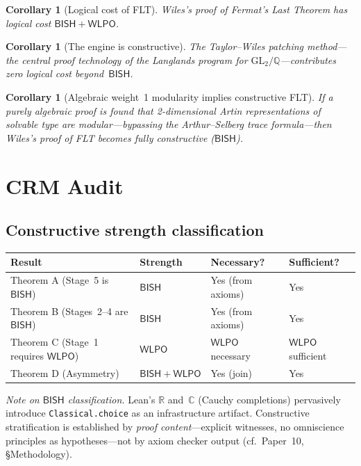 \documentclass[11pt]{article}
\theoremstyle{plain}
\newtheorem{corollary}[theorem]{Corollary}
\theoremstyle{definition}
\theoremstyle{remark}
\newcommand{\Q}{\mathbb{Q}}
\newcommand{\R}{\mathbb{R}}
\newcommand{\C}{\mathbb{C}}
\newcommand{\GL}{\mathrm{GL}}
\newcommand{\BISH}{\mathsf{BISH}}
\newcommand{\WLPO}{\mathsf{WLPO}}
\begin{document}
\begin{corollary}[Logical cost of FLT]\label{cor:flt}
Wiles's proof of Fermat's Last Theorem has logical cost
$\BISH + \WLPO$.
\end{corollary}

\begin{corollary}[The engine is constructive]\label{cor:engine}
The Taylor--Wiles patching method---the central proof technology
of the Langlands program for $\GL_2/\Q$---contributes zero
logical cost beyond~$\BISH$.
\end{corollary}

\begin{corollary}[Algebraic weight~1 modularity implies
  constructive FLT]\label{cor:alg}
If a purely algebraic proof is found that 2-dimensional Artin
representations of solvable type are modular---bypassing the
Arthur--Selberg trace formula---then Wiles's proof of FLT
becomes fully constructive ($\BISH$).
\end{corollary}


\section{CRM Audit}\label{sec:crm}

\subsection{Constructive strength classification}

\begin{center}
\renewcommand{\arraystretch}{1.15}
\begin{tabular}{llll}
\toprule
\textbf{Result} & \textbf{Strength} & \textbf{Necessary?} & \textbf{Sufficient?} \\
\midrule
Theorem A (Stage~5 is $\BISH$) & $\BISH$ & Yes (from axioms) & Yes \\
Theorem B (Stages~2--4 are $\BISH$) & $\BISH$ & Yes (from axioms) & Yes \\
Theorem C (Stage~1 requires $\WLPO$) & $\WLPO$ & $\WLPO$ necessary & $\WLPO$ sufficient \\
Theorem D (Asymmetry) & $\BISH + \WLPO$ & Yes (join) & Yes \\
\bottomrule
\end{tabular}
\end{center}

\begin{sloppypar}\smallskip\noindent
\emph{Note on $\BISH$ classification.}
Lean's $\R$ and~$\C$ (Cauchy completions) pervasively introduce
\texttt{Classical.choice} as an infrastructure artifact.
Constructive stratification is established by \emph{proof
content}---explicit witnesses, no omniscience principles as
hypotheses---not by axiom checker output
(cf.\ Paper~10, \S Methodology).
\end{sloppypar}
\end{document}

